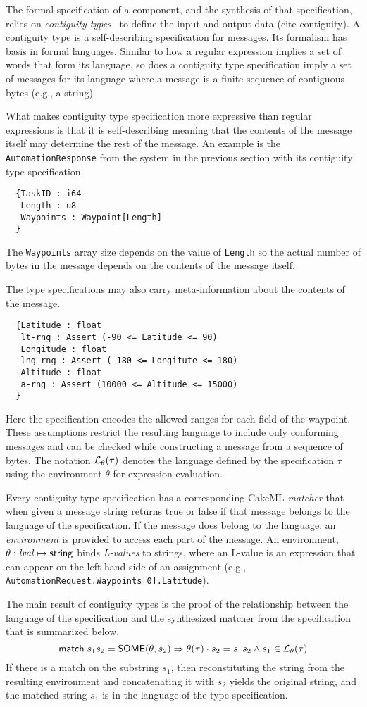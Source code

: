 The formal specification of a component, and the synthesis of that specification, relies on \emph{contiguity types}~\cite{contiguity-types} to define the input and output data (cite contiguity). A contiguity type is a self-describing specification for messages. Its formalism has basis in formal languages. Similar to how a regular expression implies a set of words that form its language, so does a contiguity type specification imply a set of messages for its language where a message is a finite sequence of contiguous bytes (e.g., a string). 

What makes contiguity type specification more expressive than regular expressions is that it is self-describing meaning that the contents of the message itself may determine the rest of the message. An example is the \texttt{AutomationResponse} from the system in the previous section with its contiguity type specification.
{\small
\begin{verbatim}
  {TaskID : i64
   Length : u8
   Waypoints : Waypoint[Length]
  }
\end{verbatim}
}
\noindent The \texttt{Waypoints} array size depends on the value of \texttt{Length} so the actual number of bytes in the message depends on the contents of the message itself. 

The type specifications may also carry meta-information about the contents of the message.
{\small
\begin{verbatim}
  {Latitude : float
   lt-rng : Assert (-90 <= Latitude <= 90) 
   Longitude : float
   lng-rng : Assert (-180 <= Longitute <= 180)
   Altitude : float
   a-rng : Assert (10000 <= Altitude <= 15000)
  }
\end{verbatim}
}
\noindent Here the specification encodes the allowed ranges for each field of the waypoint. These assumptions restrict the resulting language to include only conforming messages and can be checked while constructing a message from a sequence of bytes. The notation ${\mathcal L}_{\theta}({\tau})$ denotes the language defined by the specification $\tau$ using the environment $\theta$ for expression evaluation.

Every contiguity type specification has a corresponding CakeML \emph{matcher} that when given a message string returns true or false if that message belongs to the language of the specification. If the message does belong to the language, an \emph{environment} is provided to access each part of the message. An environment, $\theta: \mathit{lval} \mapsto \mathsf{string}$ binds \emph{L-values} to strings, where an L-value is an expression that can appear on the left hand side of an assignment (e.g., \texttt{AutomationRequest.Waypoints[0].Latitude}). 

The main result of contiguity types is the proof of the relationship between the language of the specification and the synthesized matcher from the specification that is summarized below.
\[
  \mathsf{match}\; s_1s_2 = \mathsf{SOME}(\theta, s_2)
  \Rightarrow \theta(\tau) \cdot s_2 = s_1s_2 \wedge s_1 \in {\mathcal L}_{\theta}({\tau})
\]
If there is a match on the substring $s_1$, then reconstituting the string from the resulting environment and concatenating it with $s_2$ yields the original string, and the matched string $s_1$ is in the language of the type specification. 